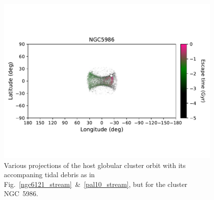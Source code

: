 \begin{figure}
\begin{center}
                    \includegraphics[clip=true, trim = 0mm 20mm 0mm 10mm, width=0.9\columnwidth]{images/PII_individual_NGC5986_NGC5986_LB_tesc.pdf}
                \end{center}
                \caption[]{Various projections of the host globular cluster orbit with its accompaning tidal debris as in Fig.~\ref{ngc6121_stream}~\&~\ref{pal10_stream}, but for the cluster NGC~5986.\label{ngc5986_stream}}
            \end{figure}   
            \onecolumn  
            
